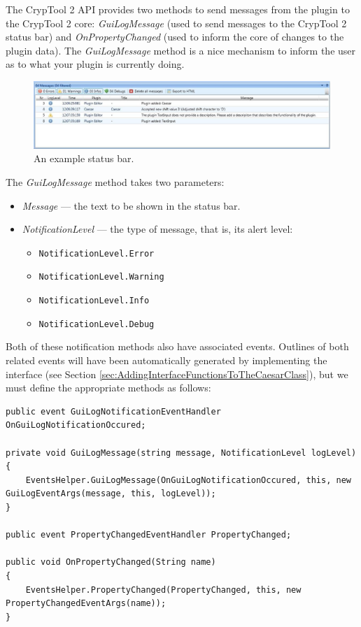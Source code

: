 The CrypTool 2 API provides two methods to send messages from the plugin to the CrypTool 2 core: \textit{GuiLogMessage} (used to send messages to the CrypTool 2 status bar) and \textit{OnPropertyChanged} (used to inform the core of changes to the plugin data). The \textit{GuiLogMessage} method is a nice mechanism to inform the user as to what your plugin is currently doing.

\begin{figure}[h]
	\centering
		\includegraphics[width=1.00\textwidth]{figures/status_bar.jpg}
	\caption{An example status bar.}
	\label{fig:status_bar}
\end{figure}
\clearpage

The \textit{GuiLogMessage} method takes two parameters:

\begin{itemize}
	\item \textit{Message} --- the text to be shown in the status bar.
	\item \textit{NotificationLevel} --- the type of message, that is, its alert level:
	\begin{itemize}
		\item \texttt{NotificationLevel.Error}
		\item \texttt{NotificationLevel.Warning}
		\item \texttt{NotificationLevel.Info}
		\item \texttt{NotificationLevel.Debug}
	\end{itemize}
\end{itemize}

Both of these notification methods also have associated events. Outlines of both related events will have been automatically generated by implementing the interface (see Section \ref{sec:AddingInterfaceFunctionsToTheCaesarClass}), but we must define the appropriate methods as follows:

\begin{lstlisting}
public event GuiLogNotificationEventHandler OnGuiLogNotificationOccured;

private void GuiLogMessage(string message, NotificationLevel logLevel)
{
	EventsHelper.GuiLogMessage(OnGuiLogNotificationOccured, this, new GuiLogEventArgs(message, this, logLevel));
}

public event PropertyChangedEventHandler PropertyChanged;

public void OnPropertyChanged(String name)
{
	EventsHelper.PropertyChanged(PropertyChanged, this, new PropertyChangedEventArgs(name));
}
\end{lstlisting}

